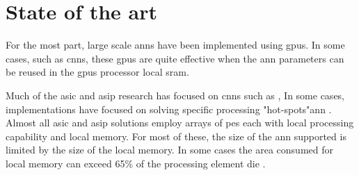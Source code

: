 
\chapter{State of the art}
\label{sec:State of the art}

For the most part, large scale \acp{ann} have been implemented using \acp{gpu}.
In some cases, such as \acp{cnn}, these \acp{gpu} are quite effective when the \ac{ann} parameters can be reused in the \acp{gpu} processor local \ac{sram}.

Much of the \ac{asic} and \ac{asip} research has focused on \acp{cnn} such as \cite{chen201614}\cite{farabet2011neuflow}, 
In some cases, implementations have focused on solving specific processing "hot-spots"\ac{ann} \cite{chen201614}.
Almost all \ac{asic} and \ac{asip} solutions employ arrays of \acp{pe} each with local processing capability and local memory.
For most of these, the size of the \ac{ann} supported is limited by the size of the local memory.
In some cases \iffalse, as seen in \fref{fig:Example state-of-the-art die}\fi the area consumed for local memory can exceed 65\% of the 
processing element die \cite{kim2016neurocube}\cite{chen2014diannao}.

